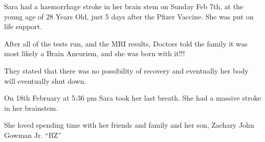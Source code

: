 Sara had a haemorrhage stroke in her brain stem on Sunday Feb 7th, at the young
age of 28 Years Old, just 5 days after the Pfizer Vaccine. She was put on life
support.

After all of the tests run, and the MRI results, Doctors told the family it was
most likely a Brain Aneurism, and she was born with it!!!

They stated that there was no possibility of recovery and eventually her body
will eventually shut down.

On 18th February at 5:36 pm Sara took her last breath. She had a massive stroke
in her brainstem.

She loved spending time with her friends and family and her son, Zachary John
Gowman Jr. “BZ”

